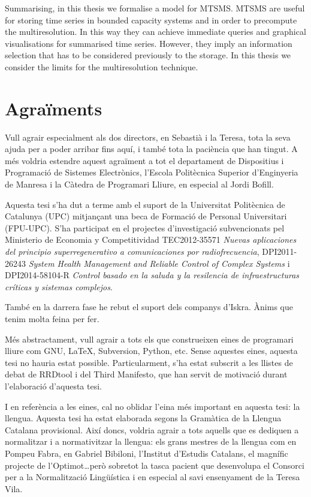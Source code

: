 Summarising, in this thesis we formalise a model for \gls{MTSMS}.
\gls{MTSMS} are useful for storing time series in bounded capacity
systems and in order to precompute the multiresolution. In this way
they can achieve immediate queries and graphical visualisations for
summarised time series.  However, they imply an information selection
that has to be considered previously to the storage. In this thesis we
consider the limits for the multiresolution technique.






\newpage


\section*{Agraïments}

Vull agrair especialment als dos directors, en Sebastià i la Teresa,
tota la seva ajuda per a poder arribar fins aquí, i també tota la
paciència que han tingut. A més voldria estendre aquest agraïment a tot el
departament de Dispositius i Programació de Sistemes Electrònics,
l'Escola Politècnica Superior d'Enginyeria de Manresa i la Càtedra de
Programari Lliure, en especial al Jordi Bofill. 

Aquesta tesi s'ha dut a terme amb el suport de la Universitat
Politècnica de Catalunya (UPC) mitjançant una beca de Formació de
Personal Universitari (FPU-UPC). S'ha participat en el projectes
d'investigació subvencionats pel Ministerio de Economia y
Competitividad TEC2012-35571 \emph{Nuevas aplicaciones del principio
  superregenerativo a comunicaciones por radiofrecuencia},
DPI2011-26243 \emph{System Health Management and Reliable Control of
  Complex Systems} i DPI2014-58104-R \emph{Control basado en la saluda
  y la resilencia de infraestructuras críticas y sistemas complejos}.


També en la darrera fase he rebut el suport dels companys
d'Iskra. Ànims que tenim molta feina per fer.


Més abstractament, vull agrair a tots els que construeixen eines de
programari lliure com GNU, \LaTeX, Subversion, Python, etc. Sense
aquestes eines, aquesta tesi no hauria estat possible.
Particularment, s'ha estat subscrit a les llistes de debat de RRDtool
i del Third Manifesto, que han servit de motivació durant l'elaboració
d'aquesta tesi.


I en referència a les eines, cal no oblidar l'eina més important en
aquesta tesi: la llengua.  Aquesta tesi ha estat elaborada segons la
Gramàtica de la Llengua Catalana provisional. Així doncs, voldria
agrair a tots aquells que es dediquen a normalitzar i a normativitzar
la llengua: els grans mestres de la llengua com en Pompeu Fabra, en
Gabriel Bibiloni, l'Institut d'Estudis Catalans, el magnífic projecte
de l'Optimot\dots però sobretot la tasca pacient que desenvolupa el
Consorci per a la Normalització Lingüística i en especial al savi
ensenyament de la Teresa Vila.



